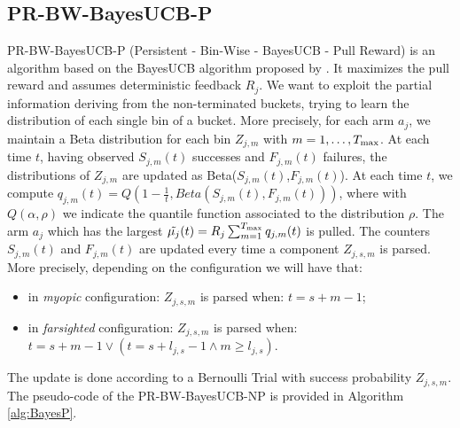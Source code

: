 \subsection{PR-BW-BayesUCB-P}
PR-BW-BayesUCB-P (Persistent - Bin-Wise - BayesUCB - Pull Reward) is an algorithm based on the BayesUCB algorithm proposed by \cite{kaufmann2012bayesian}. It maximizes the pull reward and assumes deterministic feedback $R_j$. We want to exploit the partial information deriving from the non-terminated buckets, trying to learn the distribution of each single bin of a bucket. More precisely, for each arm $a_j$, we maintain a Beta distribution for each bin $Z_{j,m}$ with $m = 1,\dots,T_{\textnormal{max}}$. At each time $t$, having observed $S_{j,m}(t)$ successes and $F_{j,m}(t)$ failures, the distributions of $Z_{j,m}$ are updated as Beta($S_{j,m}(t)$,$F_{j,m}(t)$). At each time $t$, we compute $q_{j,m}(t) = Q(1-\frac{1}{t},Beta(S_{j,m}(t),F_{j,m}(t)))$, where with $Q(\alpha,\rho)$ we indicate the quantile function associated to the distribution $\rho$.
The arm $a_j$ which has the largest $\tilde{\mu_j}(t) = R_j \sum_{m=1}^{T_{\textnormal{max}}}q_{j,m}(t) $ is pulled. The counters  $S_{j,m}(t)$ and $F_{j,m}(t)$ are updated every time a component $Z_{j,s,m}$ is parsed. More precisely, depending on the configuration we will have that:

\begin{itemize}
	\item in \emph{myopic} configuration: $Z_{j,s,m}$ is parsed when: $t=s+m-1$;
	\item in \emph{farsighted} configuration: $Z_{j,s,m}$ is parsed when: $t=s+m-1 \vee (t = s + l_{j,s} -1 \wedge m \geq l_{j,s})$.
\end{itemize}

The update is done according to a Bernoulli Trial with success probability $Z_{j,s,m}$. The pseudo-code of the PR-BW-BayesUCB-NP is provided in Algorithm \ref{alg:BayesP}.

